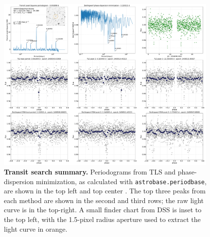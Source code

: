 \documentclass[12pt,twocolumn,tighten]{aastex62}
\begin{document}
\begin{figure}[!h]
	\begin{center}
		\leavevmode
		\includegraphics[width=0.98\textwidth]{gaiatwo0005599752663752776192-0007_page01.pdf}
	\end{center}
	\vspace{-0.5cm}
	\caption{
		{\bf Transit search summary.}
    Periodograms from TLS and phase-dispersion minimization, as
    calculated with \texttt{astrobase.periodbase}, are shown in the
    top left and top center
    \citep{bhatti_astrobase_2018,hippke_TLS_2019,stellingwerf_period_1978}.
    The top three peaks from each method are shown in the second and
    third rows; the raw light curve is in the top-right. A small
    finder chart from DSS is inset to the top left, with the 1.5-pixel
    radius aperture used to extract the light curve in orange.
		\label{fig:pg1}
	}
\end{figure}
\end{document}
